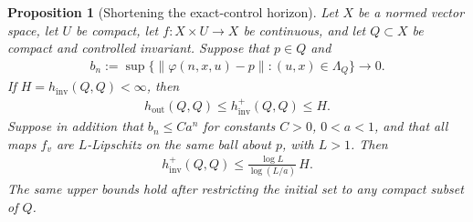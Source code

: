\documentclass[11pt,a4paper]{article}
\newtheorem{proposition}[theorem]{Proposition}
\theoremstyle{definition}
\theoremstyle{remark}
\begin{document}
\begin{proposition}[Shortening the exact-control horizon]\label{prop:shortening}
Let \(X\) be a normed vector space, let \(U\) be compact, let \(f:X\times U\to X\) be continuous, and let \(Q\subset X\) be compact and controlled invariant. Suppose that \(p\in Q\) and
\begin{align}\label{eq:uniform-collapse}
 b_n:=\sup\{\|\varphi(n,x,u)-p\|:(u,x)\in\Lambda_Q\}
 \longrightarrow0.
\end{align}
If \(H=h_{\mathrm{inv}}(Q,Q)<\infty\), then
\begin{align}\label{eq:tracking-exact-bound}
 h_{\mathrm{out}}(Q,Q)\leq h_{\mathrm{inv}}^+(Q,Q)\leq H.
\end{align}
Suppose in addition that \(b_n\leq Ca^n\) for constants \(C>0\), \(0<a<1\), and that all maps \(f_v\) are \(L\)-Lipschitz on the same ball about \(p\), with \(L>1\). Then
\begin{align}\label{eq:shortening-rate}
 h_{\mathrm{inv}}^+(Q,Q)
 \leq \frac{\log L}{\log(L/a)}\,H.
\end{align}
The same upper bounds hold after restricting the initial set to any compact subset of \(Q\).
\end{proposition}
\end{document}
